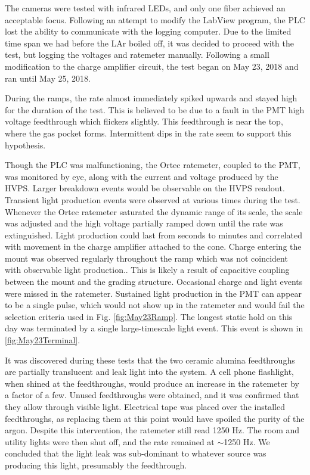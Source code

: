 The cameras were tested with infrared LEDs, and only one fiber achieved an acceptable focus. 
Following an attempt to modify the LabView program, the PLC lost the ability to communicate with the logging computer.
Due to the limited time span we had before the LAr boiled off, it was decided to proceed with the test, but logging the voltages and ratemeter manually.
Following a small modification to the charge amplifier circuit, the test began on May 23, 2018 and ran until May 25, 2018.


During the ramps, the rate almost immediately spiked upwards and stayed high for the duration of the test.
This is believed to be due to a fault in the PMT high voltage feedthrough which flickers slightly.
This feedthrough is near the top, where the gas pocket forms.
Intermittent dips in the rate seem to support this hypothesis.


Though the PLC was malfunctioning, the Ortec ratemeter, coupled to the PMT, was monitored by eye, along with the current and voltage produced by the HVPS.
Larger breakdown events would be observable on the HVPS readout.
Transient light production events were observed at various times during the test.
Whenever the Ortec ratemeter saturated the dynamic range of its scale, the scale was adjusted and the high voltage partially ramped down until the rate was extinguished. 
Light production could last from seconds to minutes and correlated with movement in the charge amplifier attached to the cone.
Charge entering the mount was observed regularly throughout the ramp which was not coincident with observable light production..
This is  likely a result of capacitive coupling between the mount and the grading structure.
Occasional charge and light events were missed in the ratemeter.
Sustained light production in the PMT can appear to be a single pulse, which would not show up in the ratemeter and would fail the selection criteria used in Fig. \ref{fig:May23Ramp}.
The longest static hold on this day was terminated by a single large-timescale light event. 
This event is shown in \ref{fig:May23Terminal}.

It was discovered during these tests that the two ceramic alumina feedthroughs are partially translucent and leak light into the system.
A cell phone flashlight, when shined at the feedthroughs, would produce an increase in the ratemeter by a factor of a few.
Unused feedthroughs were obtained, and it was confirmed that they allow through visible light.
Electrical tape was placed over the installed feedthroughs, as replacing them at this point would have spoiled the purity of the argon.
Despite this intervention, the ratemeter still read 1250 Hz. 
The room and utility lights were then shut off, and the rate remained at $\sim$1250 Hz. 
We concluded that the light leak was sub-dominant to whatever source was producing this light, presumably the feedthrough.

